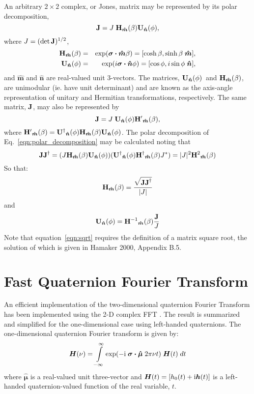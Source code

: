 \documentclass[12pt]{article}
\newcommand{\Ci}{{\rm i}}
\newcommand{\boost}[1][]{{\ensuremath{ {\bf H}{#1}_{\bm{\hat m}}(\beta) }}}
\newcommand{\rotat}[1][]{{\ensuremath{ {\bf U}{#1}_{\bm{\hat n}}(\phi) }}}
\begin{document}
An arbitrary $2\times2$ complex, or Jones, matrix may be represented
by its polar decomposition,
\begin{equation}
{\bf J} = J \; \boost \rotat,
\label{eqn:polar_decomposition}
\end{equation}
where $J=(\det{\bf J})^{1/2}$,
\begin{eqnarray}
\boost &=& \exp(\bm{\sigma\cdot}\bm{\hat m}\beta)
        = [\cosh\beta,\sinh\beta\;\bm{\hat m}],
\label{eqn:boost} \\
\rotat &=& \exp(i\bm{\sigma\cdot}\bm{\hat n}\phi)
        = [\cos\phi,i\sin\phi\;\bm{\hat n}],
\label{eqn:rotation}
\end{eqnarray}
and $\bm{\hat m}$ and $\bm{\hat n}$ are real-valued unit 3-vectors.
The matrices, \rotat\ and \boost, are unimodular (ie. have unit
determinant) and are known as the axis-angle representation of unitary
and Hermitian transformations, respectively. The same matrix, ${\bf J}$,
may also be represented by 
\begin{equation}
{\bf J}=J\;\rotat\boost[^\prime],
\end{equation}
where $\boost[^\prime]=\rotat[^\dagger]\boost\rotat$.  The polar
decomposition of Eq.~\ref{eqn:polar_decomposition} may be calculated
noting that
\begin{equation}
{\bf JJ}^\dagger = (J\boost\rotat)(\rotat[^\dagger]\boost[^\dagger]J^*)
	= |J|^2 \boost[^2]
\end{equation}
So that:
\begin{equation}\label{eqn:sqrt}
\boost = {\sqrt{{\bf JJ}^\dagger} \over |J|}
\end{equation}
and
\begin{equation}
\rotat = \boost[^{-1}] {{\bf J} \over J}
\end{equation}
Note that equation~\ref{eqn:sqrt} requires the definition of a matrix
square root, the solution of which is given in Hamaker 2000, Appendix B.5.

\section{Fast Quaternion Fourier Transform}

An efficient implementation of the two-dimensional quaternion Fourier
Transform has been implemented using the 2-D complex FFT \cite{pdc01}.
The result is summarized and simplified for the one-dimensional case
using left-handed quaternions.  The one-dimensional quaternion Fourier
transform is given by:
\begin{equation}
\bm{H}(\nu)=\intop_{-\infty}^\infty
	\exp(-\Ci\;\bm{\sigma\cdot\hat\mu}\;2\pi\nu t)\;\bm{H}(t)\;dt
\end{equation}
where $\bm{\hat\mu}$ is a real-valued unit three-vector and
$\bm{H}(t) = [h_0(t) + \Ci\bm{h}(t)]$ is a left-handed quaternion-valued
function of the real variable, $t$.
\end{document}
